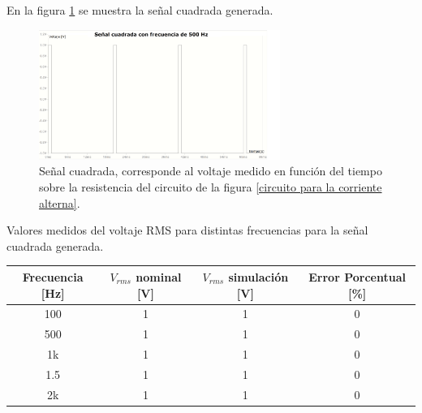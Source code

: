 \documentclass[letterpaper,11pt]{article} %
\begin{document}
En la figura \ref{señal cuadrada experiencia 1} se muestra la señal cuadrada generada.
\begin{figure}
    \centering    
    \includegraphics[width=0.7\textwidth]{experiencia 1 voltaje señal cuadrada 500 Hz.png}
    \caption{Señal cuadrada, corresponde al voltaje medido en función del tiempo sobre la resistencia del circuito de la figura \ref{circuito para la corriente alterna}. }
    \label{señal cuadrada experiencia 1}
\end{figure}
\begin{center}
Valores medidos del voltaje RMS para distintas frecuencias para la señal cuadrada generada.
\begin{tabular}{|c|c|c|c|}
\hline
\textbf{Frecuencia [Hz]} & \textbf{$V_{rms}$ nominal [V]} & \textbf{$V_{rms}$ simulación [V]} & \textbf{Error Porcentual [\%]} \\ \hline
            100       &                      1      &                1               &                0           \\ \hline
            500        &                   1         &           1                    &                0           \\ \hline
               1k     &                        1    &          1                     &                  0         \\ \hline
                 1.5   &                         1   &               1               &                   0        \\ \hline
               2k     &                         1   &                     1          &                    0       \\ \hline                 
\end{tabular}
\end{center}
\end{document}
